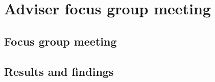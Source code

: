 \chapter{Adviser focus group meeting}
 
\section{Focus group meeting}

\section{Results and findings}
